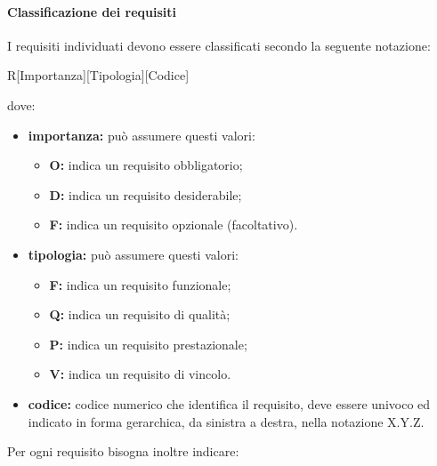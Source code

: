             \paragraph{Classificazione dei requisiti}
            I requisiti individuati devono essere classificati secondo la seguente notazione:
            \begin{center}
            R[Importanza][Tipologia][Codice]
            \end{center}
            dove:
            \begin{itemize}
                \item \textbf{importanza:} può assumere questi valori:
                \begin{itemize}
                    \item \textbf{O:} indica un requisito obbligatorio;
                    \item \textbf{D:} indica un requisito desiderabile;
                    \item \textbf{F:} indica un requisito opzionale (facoltativo).
                \end{itemize}
                \item \textbf{tipologia:} può assumere questi valori:
                \begin{itemize}
                    \item \textbf{F:} indica un requisito funzionale;
                    \item \textbf{Q:} indica un requisito di qualità;
                    \item \textbf{P:} indica un requisito prestazionale;
                    \item \textbf{V:} indica un requisito di vincolo.
                \end{itemize}
                \item \textbf{codice:} codice numerico che identifica il requisito, deve essere univoco ed indicato in forma gerarchica, da sinistra a destra, nella notazione X.Y.Z.
            \end{itemize}
            Per ogni requisito bisogna inoltre indicare:
